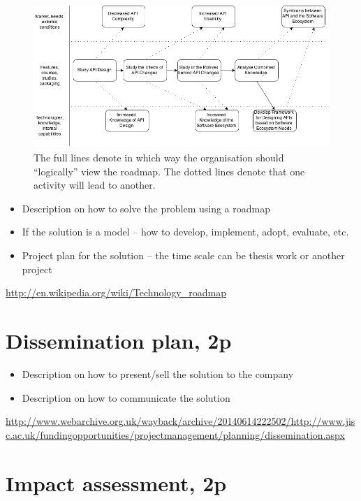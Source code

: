 \documentclass{article}
\begin{document}
\begin{figure}
\centering
\includegraphics[width=220mm]{RoadMap.png}
\caption{The full lines denote in which way the organisation should ``logically'' view the roadmap. The dotted lines denote that one activity will lead to another. }
\end{figure}

\begin{itemize}
	\item Description on how to solve the problem using a roadmap
	\item If the solution is a model – how to develop, implement, adopt, evaluate, etc.
	\item Project plan for the solution – the time scale can be thesis work or another project
\end{itemize}

\url{http://en.wikipedia.org/wiki/Technology_roadmap}

\section{Dissemination plan, 2p}

\begin{itemize}
	\item Description on how to present/sell the solution to the company
	\item Description on how to communicate the solution
\end{itemize}

\url{http://www.webarchive.org.uk/wayback/archive/20140614222502/http://www.jisc.ac.uk/fundingopportunities/projectmanagement/planning/dissemination.aspx}

\section{Impact assessment, 2p}
\end{document}
